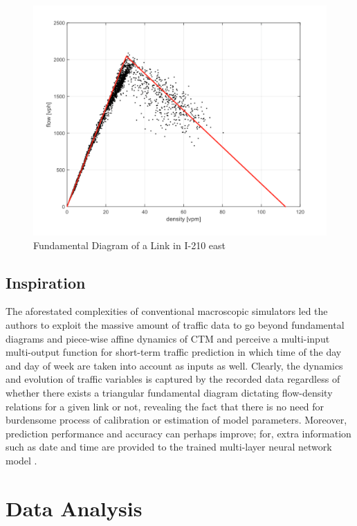 \documentclass[twocolumn,10pt]{asme2e}
\begin{document}
\begin{figure}[h]
    \centering
    \includegraphics[width=0.8\linewidth]{fd.png}
    \caption{Fundamental Diagram of a Link in I-210 east}
    \label{fig:fd}
\end{figure} 
\subsection{Inspiration}
The aforestated complexities of conventional macroscopic simulators led the authors to exploit the massive amount of traffic data to go beyond fundamental diagrams and piece-wise affine dynamics of CTM and perceive a multi-input multi-output function for short-term traffic prediction in which time of the day and day of week are taken into account as inputs as well. Clearly, the dynamics and evolution of traffic variables is captured by the recorded data regardless of whether there exists a triangular fundamental diagram dictating flow-density relations for a given link or not, revealing the fact that there is no need for burdensome process of calibration or estimation of model parameters. Moreover, prediction performance and accuracy can perhaps improve; for, extra information such as date and time are provided to the trained multi-layer neural network model \cite{neuralForcast}.  


\section{Data Analysis}
\end{document}

